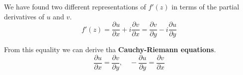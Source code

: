 \documentclass{article}
\begin{document}
We have found two different representations of \(f'(z)\) in terms
of the partial derivatives of \(u\) and \(v\).
\[
    f'(z)=\frac{\partial u}{\partial x} +i\frac{\partial v}{\partial x}
    = \frac{\partial v}{\partial y} -i \frac{\partial u}{\partial y}
\]

From this equality we can derive tha \textbf{Cauchy-Riemann equations}.
\[
    \frac{\partial u}{\partial x}=\frac{\partial v}{\partial y},
    \quad
    -\frac{\partial u}{\partial y}=\frac{\partial v}{\partial x}
\]

\end{document}
